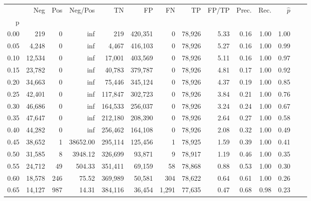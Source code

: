 \begin{tabular}{rrrrrrrrrrrrrr}
\toprule
{} &     Neg &     Pos &   Neg/Pos &       TN &       FP &      FN &      TP & FP/TP & Prec. &  Rec. & $\hat{p}$ \\
p    &         &         &           &          &          &         &         &       &       &       &           \\
\midrule
0.00 &     219 &       0 &       inf &      219 &  420,351 &       0 &  78,926 &  5.33 &  0.16 &  1.00 &      1.00 \\
0.05 &   4,248 &       0 &       inf &    4,467 &  416,103 &       0 &  78,926 &  5.27 &  0.16 &  1.00 &      0.99 \\
0.10 &  12,534 &       0 &       inf &   17,001 &  403,569 &       0 &  78,926 &  5.11 &  0.16 &  1.00 &      0.97 \\
0.15 &  23,782 &       0 &       inf &   40,783 &  379,787 &       0 &  78,926 &  4.81 &  0.17 &  1.00 &      0.92 \\
0.20 &  34,663 &       0 &       inf &   75,446 &  345,124 &       0 &  78,926 &  4.37 &  0.19 &  1.00 &      0.85 \\
0.25 &  42,401 &       0 &       inf &  117,847 &  302,723 &       0 &  78,926 &  3.84 &  0.21 &  1.00 &      0.76 \\
0.30 &  46,686 &       0 &       inf &  164,533 &  256,037 &       0 &  78,926 &  3.24 &  0.24 &  1.00 &      0.67 \\
0.35 &  47,647 &       0 &       inf &  212,180 &  208,390 &       0 &  78,926 &  2.64 &  0.27 &  1.00 &      0.58 \\
0.40 &  44,282 &       0 &       inf &  256,462 &  164,108 &       0 &  78,926 &  2.08 &  0.32 &  1.00 &      0.49 \\
0.45 &  38,652 &       1 &  38652.00 &  295,114 &  125,456 &       1 &  78,925 &  1.59 &  0.39 &  1.00 &      0.41 \\
0.50 &  31,585 &       8 &   3948.12 &  326,699 &   93,871 &       9 &  78,917 &  1.19 &  0.46 &  1.00 &      0.35 \\
0.55 &  24,712 &      49 &    504.33 &  351,411 &   69,159 &      58 &  78,868 &  0.88 &  0.53 &  1.00 &      0.30 \\
0.60 &  18,578 &     246 &     75.52 &  369,989 &   50,581 &     304 &  78,622 &  0.64 &  0.61 &  1.00 &      0.26 \\
0.65 &  14,127 &     987 &     14.31 &  384,116 &   36,454 &   1,291 &  77,635 &  0.47 &  0.68 &  0.98 &      0.23 \\

\end{tabular}
